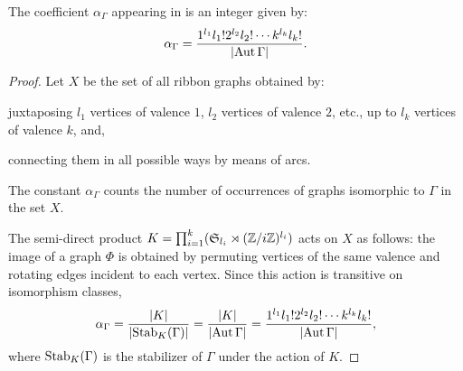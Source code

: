 \begin{lemma}\label{thm:feynman-avg-coeff}
  The coefficient $\alpha_\Gamma$ appearing in
   is an integer given by:
  \begin{equation*}
    \alpha_\Gamma =
    \frac{1^{l_1} l_1! 2^{l_2} l_2! \cdots k^{l_k} l_k!}
    {\lvert\operatorname{Aut}\Gamma\rvert}.
  \end{equation*}
\end{lemma}
\begin{proof}
  Let $X$ be the set of all ribbon graphs obtained by:
  \begin{inparaenum}
  \item juxtaposing $l_1$ vertices of valence $1$, $l_2$
    vertices of valence $2$, etc., up to $l_k$ vertices of valence
    $k$, and,
  \item connecting them in all possible ways by means of arcs.
  \end{inparaenum}
  The constant $\alpha_\Gamma$ counts the number of occurrences of graphs
  isomorphic to $\Gamma$ in the set $X$.
  
  The semi-direct product $K = \prod_{i=1}^k(\mathfrak{S}_{l_i} \rtimes
(\mathbb{Z}/i\mathbb{Z})^{l_i})$
  acts on $X$ as follows: the image of a graph
  $\Phi$ is obtained by permuting vertices of the same valence and
  rotating edges incident to each vertex. Since this action is
  transitive on isomorphism classes,
  \begin{equation*}
    \alpha_\Gamma = \frac {\lvert K\rvert} {\lvert\textrm{Stab}_K(\Gamma)\rvert}
    = \frac {\lvert K\rvert} {\lvert\operatorname{Aut}\Gamma\rvert}
    = \frac{1^{l_1} l_1! 2^{l_2} l_2! \cdots
      k^{l_k} l_k!}{\lvert\operatorname{Aut}\Gamma\rvert},
  \end{equation*}
  where $\textrm{Stab}_K(\Gamma)$ is the stabilizer of $\Gamma$ under the
  action of $K$.
\end{proof}

